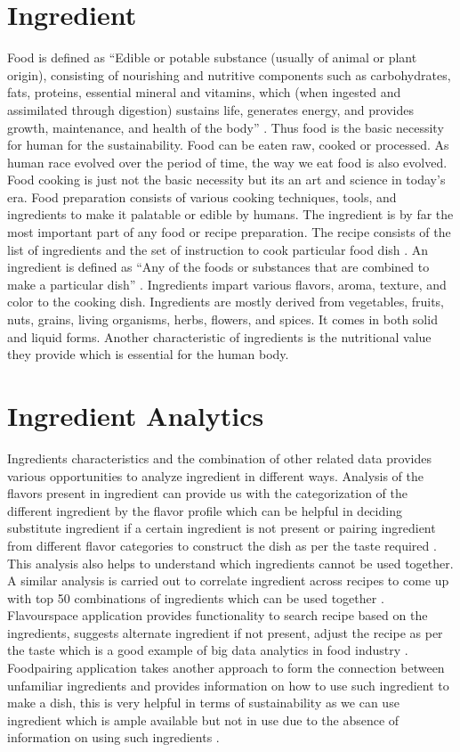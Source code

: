 \documentclass[sigconf]{acmart}
\begin{document}
\section{Ingredient}
Food is defined as ``Edible or potable substance (usually of animal or plant origin), consisting of nourishing and nutritive components such as carbohydrates, fats, proteins, essential mineral and vitamins, which (when ingested and assimilated through digestion) sustains life, generates energy, and provides growth, maintenance, and health of the body'' \cite{www-businessdictionary}. Thus food is the basic necessity for human for the sustainability. Food can be eaten raw, cooked or processed. As human race evolved over the period of time, the way we eat food is also evolved. Food cooking is just not the basic necessity but its an art and science in today's era. Food preparation consists of various cooking techniques, tools, and ingredients to make it palatable or edible by humans. The ingredient is by far the most important part of any food or recipe preparation. The recipe consists of the list of ingredients and the set of instruction to cook particular food dish \cite{www-collinsdictionary}. An ingredient is defined as ``Any of the foods or substances that are combined to make a particular dish'' \cite{www-oxforddictionaries}. Ingredients impart various flavors, aroma, texture, and color to the cooking dish. Ingredients are mostly derived from vegetables, fruits, nuts, grains, living organisms, herbs, flowers, and spices. It comes in both solid and liquid forms. Another characteristic of ingredients is the nutritional value they provide which is essential for the human body.

\section{Ingredient Analytics}
Ingredients characteristics and the combination of other related data provides various opportunities to analyze ingredient in different ways. Analysis of the flavors present in ingredient can provide us with the categorization of the different ingredient by the flavor profile which can be helpful in deciding substitute ingredient if a certain ingredient is not present or pairing ingredient from different flavor categories to construct the dish as per the taste required \cite{Ahn2011}. This analysis also helps to understand which ingredients cannot be used together. A similar analysis is carried out to correlate ingredient across recipes to come up with top 50 combinations of ingredients which can be used together \cite{www-r-bloggers}. Flavourspace application provides functionality to search recipe based on the ingredients, suggests alternate ingredient if not present, adjust the recipe as per the taste which is a good example of big data analytics in food industry \cite{www-thecul}. Foodpairing application takes another approach to form the connection between unfamiliar ingredients and provides information on how to use such ingredient to make a dish, this is very helpful in terms of sustainability as we can use ingredient which is ample available but not in use due to the absence of information on using such ingredients \cite{www-foodtech}.
\end{document}

